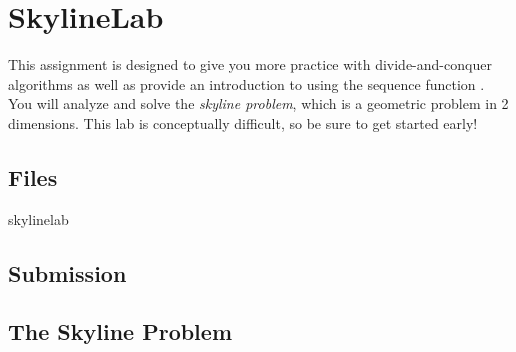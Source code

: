\chapter{SkylineLab}
\label{ch:skylinelab}

\begin{preamble}
This assignment is designed to give you more practice with divide-and-conquer
algorithms as well as provide an introduction to using the sequence function
. You will analyze and solve the \emph{skyline problem}, which is a
geometric problem in 2 dimensions. This lab is conceptually difficult, so be
sure to get started early!
\end{preamble}

\section{Files}

\begin{gram}
\begin{filesInstructions}{skylinelab}
\end{filesInstructions}
\end{gram}

\section{Submission}

\begin{gram}
\end{gram}

\section{The Skyline Problem}


